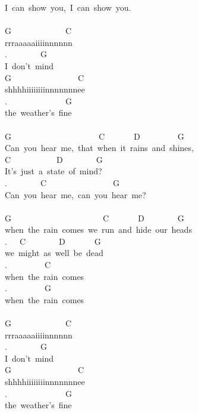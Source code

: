 {I\ can\ show\ you,\ I\ can\ show\ you.\\
\\
G\ \ \ \ \ \ \ \ \ \ \ \ \ C\ \ \ \ \\
rrraaaaaiiiinnnnnn\\
.\ \ \ \ \ \ \ \ G\\
I\ don't\ mind\\
G\ \ \ \ \ \ \ \ \ \ \ \ \ \ \ \ C\ \ \\
shhhhiiiiiiiinnnnnnnee\\
.\ \ \ \ \ \ \ \ \ \ \ \ \ \ G\\
the\ weather's\ fine\\
\\
G\ \ \ \ \ \ \ \ \ \ \ \ \ \ \ \ \ \ \ \ \ C\ \ \ \ \ \ \ D\ \ \ \ \ \ \ \ \ G\\
Can\ you\ hear\ me,\ that\ when\ it\ rains\ and\ shines,\\
C\ \ \ \ \ \ \ \ \ \ \ D\ \ \ \ \ \ \ \ G\\
It's\ just\ a\ state\ of\ mind?\\
.\ \ \ \ \ \ \ \ C\ \ \ \ \ \ \ \ \ \ \ \ \ \ \ \ G\\
Can\ you\ hear\ me,\ can\ you\ hear\ me?\\
\\
G\ \ \ \ \ \ \ \ \ \ \ \ \ \ \ \ \ \ \ \ \ \ C\ \ \ \ \ \ \ D\ \ \ \ \ \ \ \ G\\
when\ the\ rain\ comes\ we\ run\ and\ hide\ our\ heads\\
.\ \ \ C\ \ \ \ \ \ \ \ D\ \ \ \ \ \ \ G\\
we\ might\ as\ well\ be\ dead\\
.\ \ \ \ \ \ \ \ \ C\\
when\ the\ rain\ comes\\
.\ \ \ \ \ \ \ \ \ G\\
when\ the\ rain\ comes\\
\\
G\ \ \ \ \ \ \ \ \ \ \ \ \ C\ \ \ \ \\
rrraaaaaiiiinnnnnn\\
.\ \ \ \ \ \ \ \ G\\
I\ don't\ mind\\
G\ \ \ \ \ \ \ \ \ \ \ \ \ \ \ \ C\ \ \\
shhhhiiiiiiiinnnnnnnee\\
.\ \ \ \ \ \ \ \ \ \ \ \ \ \ G\\
the\ weather's\ fine}
